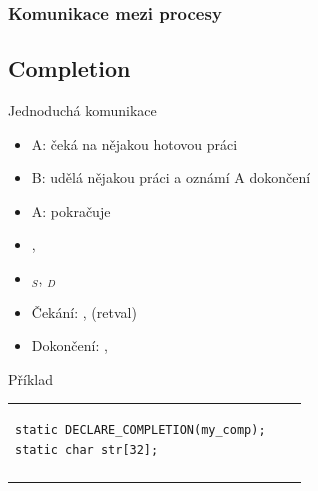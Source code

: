 
\begin{frame}
  \frametitle{Komunikace mezi procesy}


  \iffimuni
    \bigskip

    \tableofcontents
  \fi

\end{frame}


\iffimuni
\subsection{Completion}
\fi

\begin{frame}[fragile]{Jednoduchá komunikace}

  \begin{itemize}
    \item A: čeká na nějakou hotovou práci
    \item B: udělá nějakou práci a oznámí A dokončení
    \item A: pokračuje
  \end{itemize}

  \pause

  \begin{itemize}
    \item {}, 
    \item {}$_S$, $_D$
    \item Čekání: ,
       (retval)
    \item Dokončení: , 
  \end{itemize}

  \pause

  \begin{block}{Příklad}
    \begin{tabular}{lp{5em}l}
      \begin{lstlisting}[aboveskip=2pt,belowskip=0pt]
static DECLARE_COMPLETION(my_comp);
static char str[32];
      \end{lstlisting} \\

      \pause


\end{tabular}
\end{block}
\end{frame}
